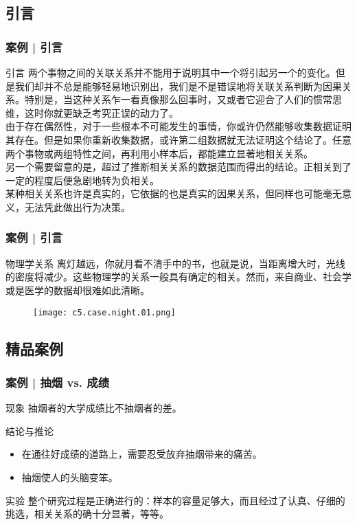 \subsection{引言}
\begin{frame}
  \frametitle{案例 | 引言}
  \begin{block}{引言}
两个事物之间的关联关系并不能用于说明其中一个将引起另一个的变化。但是我们却并不总是能够轻易地识别出，我们是不是错误地将关联关系判断为因果关系。特别是，当这种关系乍一看真像那么回事时，又或者它迎合了人们的惯常思维，这时你就更缺乏考究正误的动力了。\\
\vspace{0.5em}
由于存在偶然性，对于一些根本不可能发生的事情，你或许仍然能够收集数据证明其存在。但是如果你重新收集数据，或许第二组数据就无法证明这个结论了。任意两个事物或两组特性之间，再利用小样本后，都能建立显著地相关关系。\\
\vspace{0.5em}
另一个需要留意的是，超过了推断相关关系的数据范围而得出的结论。正相关到了一定的程度后便急剧地转为负相关。\\
\vspace{0.5em}
某种相关关系也许是真实的，它依据的也是真实的因果关系，但同样也可能毫无意义，无法凭此做出行为决策。
  \end{block}
\end{frame}

\begin{frame}
  \frametitle{案例 | 引言}
  \begin{block}{物理学关系}
离灯越远，你就月看不清手中的书，也就是说，当距离增大时，光线的密度将减少。这些物理学的关系一般具有确定的相关。然而，来自商业、社会学或是医学的数据却很难如此清晰。
  \end{block}
  \vspace{-0.5em}
  \begin{figure}
    \centering
    \texttt{[image: c5.case.night.01.png]}
  \end{figure}
\end{frame}

\subsection{精品案例}
\begin{frame}
  \frametitle{案例 | 抽烟 vs. 成绩}
  \begin{block}{现象}
    抽烟者的大学成绩比不抽烟者的差。
  \end{block}
  \pause
  \begin{block}{结论与推论}
    \begin{itemize}
      \item 在通往好成绩的道路上，需要忍受放弃抽烟带来的痛苦。
      \item 抽烟使人的头脑变笨。
    \end{itemize}
  \end{block}
  \pause
  \begin{block}{实验}
    整个研究过程是正确进行的：样本的容量足够大，而且经过了认真、仔细的挑选，相关关系的确十分显著，等等。
  \end{block}
\end{frame}

